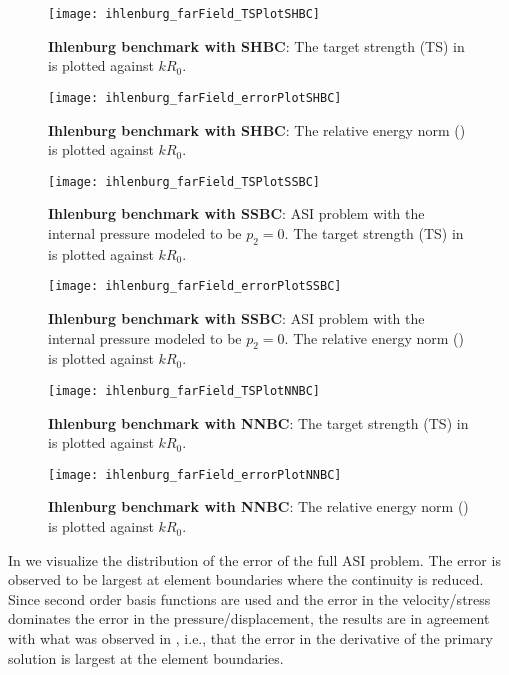 \begin{figure}
	\centering
	\texttt{[image: ihlenburg\_farField\_TSPlotSHBC]}
	\caption{\textbf{Ihlenburg benchmark with SHBC}: The target strength (TS) in  is plotted against $kR_0$.}
	\label{Fig2:TSPlotSHBC}
	\par\bigskip
	\par\bigskip
	\texttt{[image: ihlenburg\_farField\_errorPlotSHBC]}
	\caption{\textbf{Ihlenburg benchmark with SHBC}: The relative energy norm () is plotted against $kR_0$.}
	\label{Fig2:errorPlotSHBC}
\end{figure}
\begin{figure}
	\centering
	\texttt{[image: ihlenburg\_farField\_TSPlotSSBC]}
	\caption{\textbf{Ihlenburg benchmark with SSBC}: ASI problem with the internal pressure modeled to be $p_2=0$. The target strength (TS) in  is plotted against $kR_0$.}
	\label{Fig2:TSPlotSSBC}
	\par\bigskip
	\par\bigskip
	\texttt{[image: ihlenburg\_farField\_errorPlotSSBC]}
	\caption{\textbf{Ihlenburg benchmark with SSBC}: ASI problem with the internal pressure modeled to be $p_2=0$. The relative energy norm () is plotted against $kR_0$.}
	\label{Fig2:errorPlotSSBC}
\end{figure}
\begin{figure}
	\centering
	\texttt{[image: ihlenburg\_farField\_TSPlotNNBC]}
	\caption{\textbf{Ihlenburg benchmark with NNBC}: The target strength (TS) in  is plotted against $kR_0$.}
	\label{Fig2:TSPlotNNBC}
	\par\bigskip
	\par\bigskip
	\texttt{[image: ihlenburg\_farField\_errorPlotNNBC]}
	\caption{\textbf{Ihlenburg benchmark with NNBC}: The relative energy norm () is plotted against $kR_0$.}
	\label{Fig2:errorPlotNNBC}
\end{figure}
In  we visualize the distribution of the error of the full ASI problem. The error is observed to be largest at element boundaries where the continuity is reduced. Since second order basis functions are used and the error in the velocity/stress dominates the error in the pressure/displacement, the results are in agreement with what was observed in \cite{Kumar2017spr}, i.e., that the error in the derivative of the primary solution is largest at the element boundaries.
